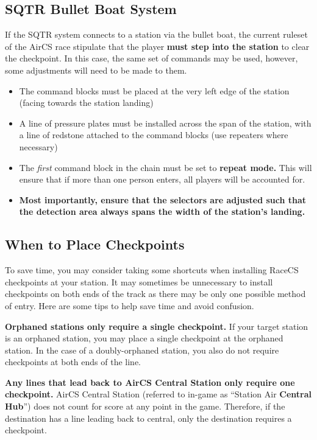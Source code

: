 \documentclass{article}
\begin{document}
\subsection{SQTR Bullet Boat System}
If the SQTR system connects to a station via the bullet boat, the current ruleset of the AirCS race stipulate that the player \textbf{must step into the station} to clear the checkpoint. In this case, the same set of commands may be used, however, some adjustments will need to be made to them.
\begin{itemize}
    \item The command blocks must be placed at the very left edge of the station (facing towards the station landing)
    \item A line of pressure plates must be installed across the span of the station, with a line of redstone attached to the command blocks (use repeaters where necessary)
    \item The \textit{first} command block in the chain must be set to \textbf{repeat mode.} This will ensure that if more than one person enters, all players will be accounted for.
    \item \textbf{Most importantly, ensure that the selectors are adjusted such that the detection area always spans the width of the station's landing.}
\end{itemize}

\subsection{When to Place Checkpoints}
To save time, you may consider taking some shortcuts when installing RaceCS checkpoints at your station. It may sometimes be unnecessary to install checkpoints on both ends of the track as there may be only one possible method of entry. Here are some tips to help save time and avoid confusion.

\medskip

\textbf{Orphaned stations only require a single checkpoint.} If your target station is an orphaned station, you may place a single checkpoint at the orphaned station. In the case of a doubly-orphaned station, you also do not require checkpoints at both ends of the line.

\medskip

\textbf{Any lines that lead back to AirCS Central Station only require one checkpoint.} AirCS Central Station (referred to in-game as ``Station Air \textbf{Central Hub}'') does not count for score at any point in the game. Therefore, if the destination has a line leading back to central, only the destination requires a checkpoint.
\end{document}
